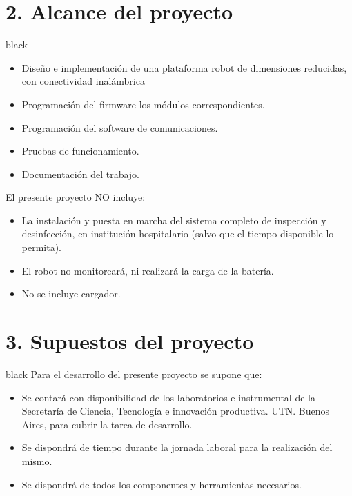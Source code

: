 \documentclass[11pt]{charter}
\begin{document}
\section{2. Alcance del proyecto}\label{sec:alcance}
\begin{consigna}{black}
\vspace{-12mm}
\begin{itemize}
\item Diseño e implementación de una plataforma robot de dimensiones reducidas, con conectividad inalámbrica
\item Programación del firmware los módulos correspondientes. 
\item Programación del software de comunicaciones. 
\item Pruebas de funcionamiento.
\item Documentación del trabajo. 
\end{itemize}
El presente proyecto NO incluye: 
\begin{itemize}
\item La instalación y puesta en marcha del sistema completo de inspección y desinfección, en institución hospitalario (salvo que el tiempo disponible lo permita). 
\item El robot no monitoreará,  ni  realizará la carga de la batería.
\item No se incluye cargador.
\end{itemize}
\end{consigna}

\section{3. Supuestos del proyecto}
\label{sec:supuestos}

\begin{consigna}{black}
Para el desarrollo del presente proyecto se supone que: 

\begin{itemize}
\item Se contará con disponibilidad de los laboratorios e instrumental de la  Secretaría de Ciencia, Tecnología e innovación productiva. UTN. Buenos Aires, para cubrir la tarea de desarrollo.
\item Se dispondrá de tiempo durante la jornada laboral para la realización del mismo. 
\item  Se dispondrá de todos los componentes y herramientas necesarios. 
\end{itemize}

\end{consigna}
\end{document}
